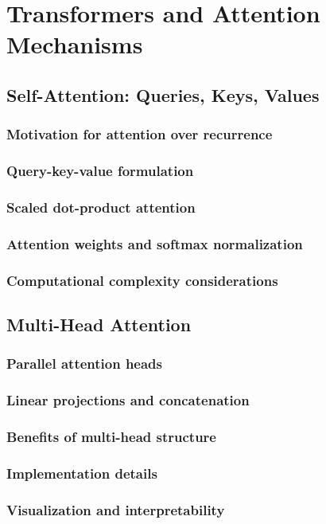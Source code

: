 ﻿\chapter{Transformers and Attention Mechanisms}
\section{Self-Attention: Queries, Keys, Values}
\subsection{Motivation for attention over recurrence}
\subsection{Query-key-value formulation}
\subsection{Scaled dot-product attention}
\subsection{Attention weights and softmax normalization}
\subsection{Computational complexity considerations}

\section{Multi-Head Attention}
\subsection{Parallel attention heads}
\subsection{Linear projections and concatenation}
\subsection{Benefits of multi-head structure}
\subsection{Implementation details}
\subsection{Visualization and interpretability}

